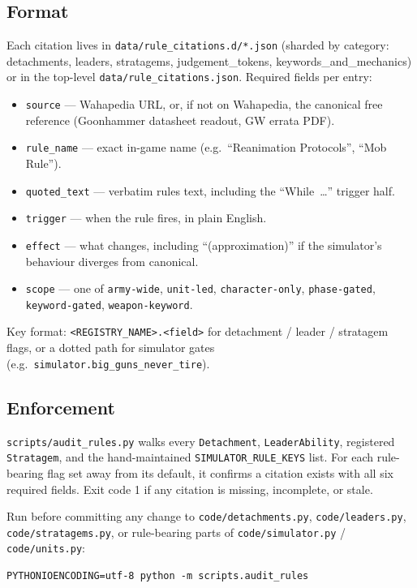 \documentclass[11pt,a4paper]{article}
\begin{document}
\subsection{Format}
Each citation lives in \texttt{data/rule\_citations.d/*.json} (sharded
by category: detachments, leaders, stratagems, judgement\_tokens,
keywords\_and\_mechanics) or in the top-level \texttt{data/rule\_citations.json}.
Required fields per entry:
\begin{itemize}[itemsep=2pt]
  \item \texttt{source} --- Wahapedia URL, or, if not on Wahapedia, the
    canonical free reference (Goonhammer datasheet readout, GW errata PDF).
  \item \texttt{rule\_name} --- exact in-game name (e.g.\ ``Reanimation
    Protocols'', ``Mob Rule'').
  \item \texttt{quoted\_text} --- verbatim rules text, including the
    ``While~\dots'' trigger half.
  \item \texttt{trigger} --- when the rule fires, in plain English.
  \item \texttt{effect} --- what changes, including ``(approximation)''
    if the simulator's behaviour diverges from canonical.
  \item \texttt{scope} --- one of \texttt{army-wide}, \texttt{unit-led},
    \texttt{character-only}, \texttt{phase-gated}, \texttt{keyword-gated},
    \texttt{weapon-keyword}.
\end{itemize}

Key format: \texttt{<REGISTRY\_NAME>.<field>} for detachment / leader /
stratagem flags, or a dotted path for simulator gates
(e.g.\ \texttt{simulator.big\_guns\_never\_tire}).

\subsection{Enforcement}
\texttt{scripts/audit\_rules.py} walks every \texttt{Detachment},
\texttt{LeaderAbility}, registered \texttt{Stratagem}, and the
hand-maintained \texttt{SIMULATOR\_RULE\_KEYS} list. For each
rule-bearing flag set away from its default, it confirms a citation
exists with all six required fields. Exit code 1 if any citation is
missing, incomplete, or stale.

Run before committing any change to \texttt{code/detachments.py},
\texttt{code/leaders.py}, \texttt{code/stratagems.py}, or rule-bearing
parts of \texttt{code/simulator.py} / \texttt{code/units.py}:
\begin{verbatim}
PYTHONIOENCODING=utf-8 python -m scripts.audit_rules
\end{verbatim}
\end{document}
